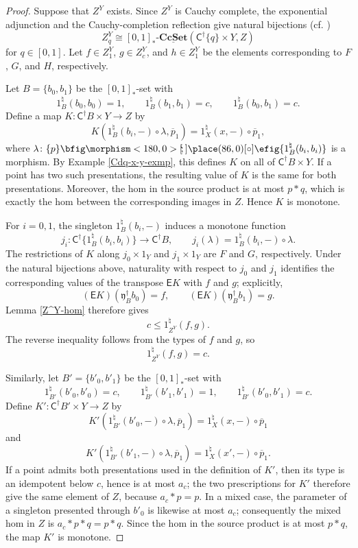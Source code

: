 \documentclass{birkau}
\theoremstyle{plain}
\theoremstyle{definition}
\def\oto{{\bfig\morphism<180,0>[\mkern-4mu`\mkern-4mu;]\place(86,0)[\circ]\efig}}
\newcommand{\nat}{\natural}
\newcommand{\lam}{\lambda}
\newcommand{\sC}{\mathsf{C}}
\newcommand{\sE}{\mathsf{E}}
\newcommand{\Fy}{\mathfrak{y}}
\newcommand{\CcSet}{\mathbf{CcSet}}
\newcommand{\RCcSetM}{[0,1]_*\text{-}\underline{\CcSet}}
\newcommand{\sCd}{\sC^{\dag}}
\newcommand{\Fyd}{\Fy^{\dag}}
\renewcommand{\leq}{\leqslant}
\numberwithin{equation}{section}
\begin{document}
\begin{proof}
Suppose that $Z^Y$ exists. Since $Z^Y$ is Cauchy complete, the exponential adjunction and the Cauchy-completion reflection give natural bijections (cf. \cite[(4.vi)--(4.viii)]{Shen2026})
\[
Z^Y_q\cong\RCcSetM(\sCd\{q\}\times Y,Z)
\]
for $q\in[0,1]$. Let $f\in Z^Y_1$, $g\in Z^Y_c$, and $h\in Z^Y_1$ be the elements corresponding to $F$, $G$, and $H$, respectively.

Let $B=\{b_0,b_1\}$ be the $[0,1]_*$-set with
\[
1_B^{\nat}(b_0,b_0)=1,\qquad
1_B^{\nat}(b_1,b_1)=c,\qquad
1_B^{\nat}(b_0,b_1)=c.
\]
Define a map $K\colon\sCd B\times Y\to Z$ by
\[
K\left(1_B^{\nat}(b_i,-)\circ\lam,\overline{p}_1\right)
=1_X^{\nat}(x,-)\circ\overline{p}_1,
\]
where $\lam\colon\{p\}\oto\{1_B^{\nat}(b_i,b_i)\}$ is a morphism. By Example \ref{Cdq-x-y-exmp}, this defines $K$ on all of $\sCd B\times Y$. If a point has two such presentations, the resulting value of $K$ is the same for both presentations. Moreover, the hom in the source product is at most $p*q$, which is exactly the hom between the corresponding images in $Z$. Hence $K$ is monotone.

For $i=0,1$, the singleton $1_B^{\nat}(b_i,-)$ induces a monotone function
\[
j_i\colon\sCd\{1_B^{\nat}(b_i,b_i)\}\to\sCd B,\qquad
j_i(\lam)=1_B^{\nat}(b_i,-)\circ\lam.
\]
The restrictions of $K$ along $j_0\times1_Y$ and $j_1\times1_Y$ are $F$ and $G$, respectively. Under the natural bijections above, naturality with respect to $j_0$ and $j_1$ identifies the corresponding values of the transpose $\sE K$ with $f$ and $g$; explicitly,
\[
(\sE K)(\Fyd_B b_0)=f,\qquad (\sE K)(\Fyd_B b_1)=g.
\]
Lemma \ref{Z^Y-hom} therefore gives
\[
c\leq1_{Z^Y}^{\nat}(f,g).
\]
The reverse inequality follows from the types of $f$ and $g$, so
\[
1_{Z^Y}^{\nat}(f,g)=c.
\]

Similarly, let $B'=\{b'_0,b'_1\}$ be the $[0,1]_*$-set with
\[
1_{B'}^{\nat}(b'_0,b'_0)=c,\qquad
1_{B'}^{\nat}(b'_1,b'_1)=1,\qquad
1_{B'}^{\nat}(b'_0,b'_1)=c.
\]
Define $K'\colon\sCd B'\times Y\to Z$ by
\[
K'\left(1_{B'}^{\nat}(b'_0,-)\circ\lam,\overline{p}_1\right)
=1_X^{\nat}(x,-)\circ\overline{p}_1
\]
and
\[
K'\left(1_{B'}^{\nat}(b'_1,-)\circ\lam,\overline{p}_1\right)
=1_X^{\nat}(x',-)\circ\overline{p}_1.
\]
If a point admits both presentations used in the definition of $K'$, then its type is an idempotent below $c$, hence is at most $a_c$; the two prescriptions for $K'$ therefore give the same element of $Z$, because $a_c*p=p$. In a mixed case, the parameter of a singleton presented through $b'_0$ is likewise at most $a_c$; consequently the mixed hom in $Z$ is $a_c*p*q=p*q$. Since the hom in the source product is at most $p*q$, the map $K'$ is monotone.


\end{proof}
\end{document}
